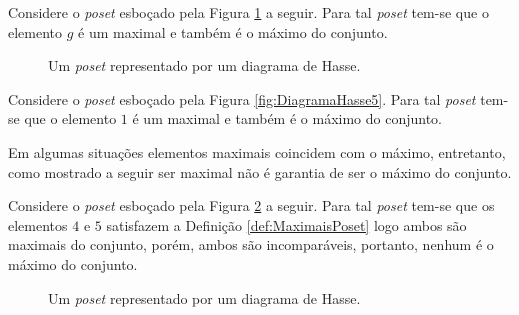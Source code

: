 \begin{example}
	Considere o \textit{poset} esboçado pela Figura \ref{fig:DiagramaHasse7} a seguir. Para tal \textit{poset} tem-se que o elemento $g$ é um maximal e também é o máximo do conjunto.
	
	\begin{figure}[h]
		\centering
		\caption{Um \textit{poset} representado por um diagrama de Hasse.}
		\label{fig:DiagramaHasse7}
	\end{figure}
\end{example}

\begin{example}
	Considere o \textit{poset} esboçado pela Figura \ref{fig:DiagramaHasse5}. Para tal \textit{poset} tem-se que o elemento $1$ é um maximal e também é o máximo do conjunto.
\end{example}

Em algumas situações elementos maximais coincidem com o máximo, entretanto, como mostrado a seguir ser maximal não é garantia de ser o máximo do conjunto.

\begin{example}
	Considere o \textit{poset} esboçado pela Figura \ref{fig:DiagramaHasse8} a seguir. Para tal \textit{poset} tem-se que os elementos $4$ e $5$ satisfazem a Definição \ref{def:MaximaisPoset} logo ambos são maximais do conjunto, porém, ambos são incomparáveis, portanto, nenhum é o máximo do conjunto.
	
	\begin{figure}[h]
		\centering
		\caption{Um \textit{poset} representado por um diagrama de Hasse.}
		\label{fig:DiagramaHasse8}
	\end{figure}
\end{example} 


